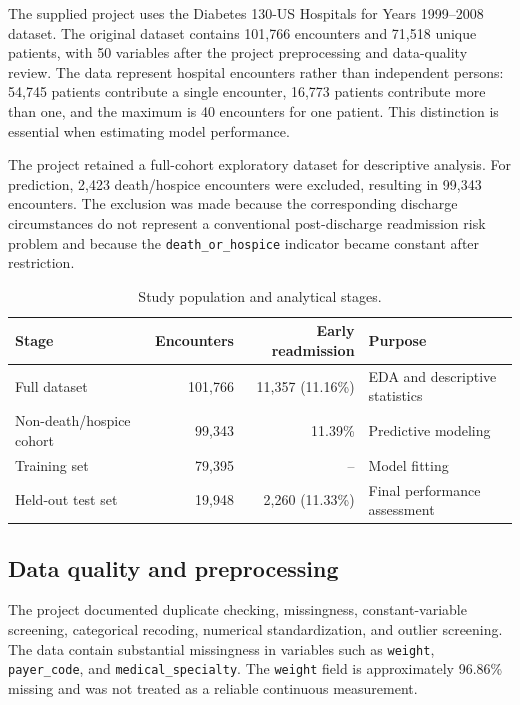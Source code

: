 \documentclass[10pt,a4paper]{article}
\begin{document}
The supplied project uses the Diabetes 130-US Hospitals for Years 1999--2008 dataset. The original dataset contains 101,766 encounters and 71,518 unique patients, with 50 variables after the project preprocessing and data-quality review. The data represent hospital encounters rather than independent persons: 54,745 patients contribute a single encounter, 16,773 patients contribute more than one, and the maximum is 40 encounters for one patient. This distinction is essential when estimating model performance.

The project retained a full-cohort exploratory dataset for descriptive analysis. For prediction, 2,423 death/hospice encounters were excluded, resulting in 99,343 encounters. The exclusion was made because the corresponding discharge circumstances do not represent a conventional post-discharge readmission risk problem and because the \texttt{death\_or\_hospice} indicator became constant after restriction.

\begin{table}[H]
\centering
\caption{Study population and analytical stages.}
\label{tab:cohort}
\begin{tabularx}{\textwidth}{lrrY}
\toprule
Stage & Encounters & Early readmission & Purpose\\
\midrule
Full dataset & 101,766 & 11,357 (11.16\%) & EDA and descriptive statistics\\
Non-death/hospice cohort & 99,343 & 11.39\% & Predictive modeling\\
Training set & 79,395 & -- & Model fitting\\
Held-out test set & 19,948 & 2,260 (11.33\%) & Final performance assessment\\
\bottomrule
\end{tabularx}
\end{table}

\subsection{Data quality and preprocessing}

The project documented duplicate checking, missingness, constant-variable screening, categorical recoding, numerical standardization, and outlier screening. The data contain substantial missingness in variables such as \texttt{weight}, \texttt{payer\_code}, and \texttt{medical\_specialty}. The \texttt{weight} field is approximately 96.86\% missing and was not treated as a reliable continuous measurement.
\end{document}
